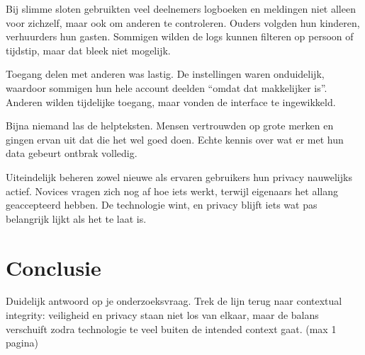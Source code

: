 \documentclass[nonacm, sigconf]{acmart}
\begin{document}
    Bij slimme sloten gebruikten veel deelnemers logboeken en meldingen niet alleen voor zichzelf, maar ook om anderen te controleren.
    Ouders volgden hun kinderen, verhuurders hun gasten.
    Sommigen wilden de logs kunnen filteren op persoon of tijdstip, maar dat bleek niet mogelijk.

    Toegang delen met anderen was lastig.
    De instellingen waren onduidelijk, waardoor sommigen hun hele account deelden ``omdat dat makkelijker is''.
    Anderen wilden tijdelijke toegang, maar vonden de interface te ingewikkeld.

    Bijna niemand las de helpteksten.
    Mensen vertrouwden op grote merken en gingen ervan uit dat die het wel goed doen.
    Echte kennis over wat er met hun data gebeurt ontbrak volledig.

    Uiteindelijk beheren zowel nieuwe als ervaren gebruikers hun privacy nauwelijks actief.
    Novices vragen zich nog af hoe iets werkt, terwijl eigenaars het allang geaccepteerd hebben.
    De technologie wint, en privacy blijft iets wat pas belangrijk lijkt als het te laat is.


    \section{Conclusie}
    Duidelijk antwoord op je onderzoeksvraag.
    Trek de lijn terug naar contextual integrity: veiligheid en privacy staan niet los van elkaar, maar de balans verschuift zodra technologie te veel buiten de intended context gaat. (max 1 pagina)

    \printbibliography

    \balance %
\end{document}
